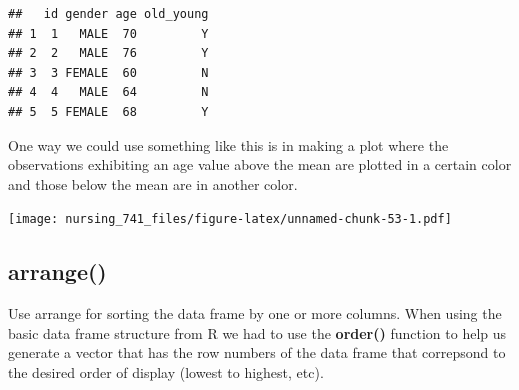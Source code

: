 \documentclass[]{book}
\newenvironment{Shaded}{\begin{snugshade}}{\end{snugshade}}
\newcommand{\DataTypeTok}[1]{\textcolor[rgb]{0.13,0.29,0.53}{#1}}
\newcommand{\DecValTok}[1]{\textcolor[rgb]{0.00,0.00,0.81}{#1}}
\newcommand{\KeywordTok}[1]{\textcolor[rgb]{0.13,0.29,0.53}{\textbf{#1}}}
\newcommand{\NormalTok}[1]{#1}
\newcommand{\OperatorTok}[1]{\textcolor[rgb]{0.81,0.36,0.00}{\textbf{#1}}}
\newcommand{\StringTok}[1]{\textcolor[rgb]{0.31,0.60,0.02}{#1}}
\begin{document}
\begin{verbatim}
##   id gender age old_young
## 1  1   MALE  70         Y
## 2  2   MALE  76         Y
## 3  3 FEMALE  60         N
## 4  4   MALE  64         N
## 5  5 FEMALE  68         Y
\end{verbatim}

One way we could use something like this is in making a plot where the observations exhibiting an age value above the mean are plotted in a certain color and those below the mean are in another color.

\begin{Shaded}
\end{Shaded}

\texttt{[image: nursing\_741\_files/figure-latex/unnamed-chunk-53-1.pdf]}

\hypertarget{arrange}{%
\subsection{arrange()}\label{arrange}}

Use arrange for sorting the data frame by one or more columns. When using the basic data frame structure from R we had to use the \textbf{order()} function to help us generate a vector that has the row numbers of the data frame that correpsond to the desired order of display (lowest to highest, etc).
\end{document}
